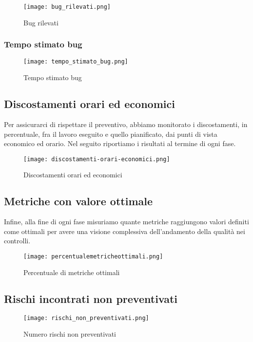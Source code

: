 \documentclass[../piano-di-qualifica.tex]{subfiles}
\begin{document}
\begin{figure}[H]
  \centering
  \texttt{[image: bug\_rilevati.png]}%
  \caption{Bug rilevati}%
  \label{fig:bug_rilevati}%
\end{figure}

\subsubsection{Tempo stimato bug}%
\label{subs:tempo_stimato}

\begin{figure}[H]
  \centering
  \texttt{[image: tempo\_stimato\_bug.png]}%
  \caption{Tempo stimato bug}%
  \label{fig:tempo_stimato_bug}%
\end{figure}


\newpage

\subsection{Discostamenti orari ed economici}%
\label{sub:discostamenti_orari_ed_economici}
Per assicurarci di rispettare il preventivo, abbiamo monitorato i discostamenti, in percentuale, fra il lavoro eseguito e quello pianificato, dai punti di vista economico ed orario. Nel seguito riportiamo i risultati al termine di ogni fase.

\begin{figure}[H]
  \centering
  \texttt{[image: discostamenti-orari-economici.png]}%
  \caption{Discostamenti orari ed economici}%
  \label{fig:discostamenti_orari_economici}%
\end{figure}

\subsection{Metriche con valore ottimale}%
\label{sub:metriche_ottimali}
Infine, alla fine di ogni fase misuriamo quante metriche raggiungono valori definiti come ottimali per avere una visione complessiva dell'andamento della qualità nei controlli.
\begin{figure}[H]
  \centering
  \texttt{[image: percentualemetricheottimali.png]}%
  \caption{Percentuale di metriche ottimali}%
  \label{fig:metriche_ottimali}%
\end{figure}

\newpage

\subsection{Rischi incontrati non preventivati}

\begin{figure}[H]
  \centering
  \texttt{[image: rischi\_non\_preventivati.png]}%
  \caption{Numero rischi non preventivati}%
  \label{fig:rischi_non_preventivati}%
\end{figure}
\end{document}
